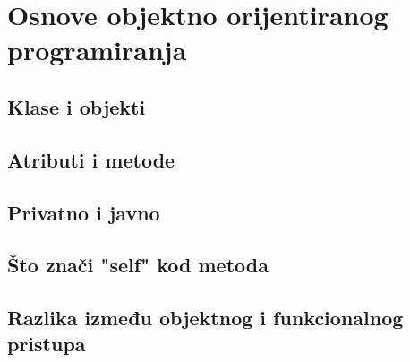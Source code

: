 \chapter{Osnove objektno orijentiranog programiranja}

\section{Klase i objekti}

\section{Atributi i metode}

\section{Privatno i javno}

\section{Što znači "self" kod metoda}

\section{Razlika između objektnog i funkcionalnog pristupa}

